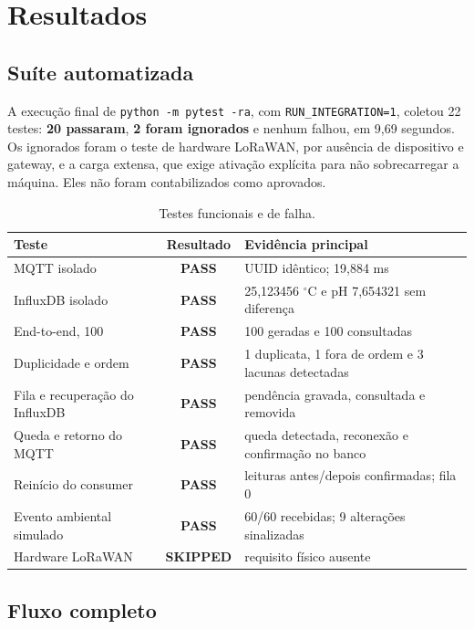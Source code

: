 \documentclass[12pt,a4paper]{article}
\newcommand{\pass}{\textcolor{verdepass}{\textbf{PASS}}}
\newcommand{\skipresult}{\textcolor{cinzatexto}{\textbf{SKIPPED}}}
\newcommand{\code}[1]{\texttt{#1}}
\begin{document}
\section{Resultados}\label{sec:resultados}

\subsection{Suíte automatizada}

A execução final de \code{python -m pytest -ra}, com \code{RUN\_INTEGRATION=1}, coletou 22 testes: \textbf{20 passaram}, \textbf{2 foram ignorados} e nenhum falhou, em 9,69 segundos. Os ignorados foram o teste de hardware LoRaWAN, por ausência de dispositivo e gateway, e a carga extensa, que exige ativação explícita para não sobrecarregar a máquina. Eles não foram contabilizados como aprovados.

\begin{table}[htbp]
\centering
\caption{Testes funcionais e de falha.}
\begin{tabularx}{\textwidth}{X c X}
\toprule
Teste & Resultado & Evidência principal \\
\midrule
MQTT isolado & \pass & UUID idêntico; 19,884 ms \\
InfluxDB isolado & \pass & 25,123456 $^{\circ}$C e pH 7,654321 sem diferença \\
End-to-end, 100 & \pass & 100 geradas e 100 consultadas \\
Duplicidade e ordem & \pass & 1 duplicata, 1 fora de ordem e 3 lacunas detectadas \\
Fila e recuperação do InfluxDB & \pass & pendência gravada, consultada e removida \\
Queda e retorno do MQTT & \pass & queda detectada, reconexão e confirmação no banco \\
Reinício do consumer & \pass & leituras antes/depois confirmadas; fila 0 \\
Evento ambiental simulado & \pass & 60/60 recebidas; 9 alterações sinalizadas \\
Hardware LoRaWAN & \skipresult & requisito físico ausente \\
\bottomrule
\end{tabularx}
\end{table}

\subsection{Fluxo completo}
\end{document}
